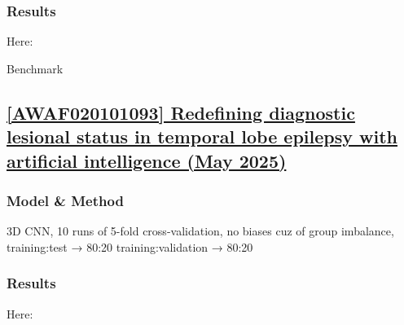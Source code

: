 \subsubsection{Results}

Here: 

\begin{table}[htbp]
	\centering
	\caption{Benchmark}

	\caption{Results from }
	\label{tab:res6}
\end{table}

\newpage
\subsection{\href{https://academic.oup.com/brain/advance-article/doi/10.1093/brain/awaf020/7972755\#510821169}{[AWAF020101093] Redefining diagnostic lesional status in temporal lobe epilepsy with artificial intelligence (May 2025) }}
\label{res7}

\subsubsection{Model \& Method}

3D CNN,
10 runs of 5-fold cross-validation,
no biases cuz of group imbalance,
training:test → 80:20
training:validation → 80:20

\subsubsection{Results}

Here: 

